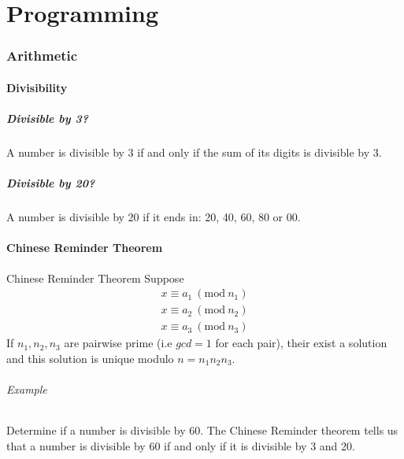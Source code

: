 \part{Programming}

\section{Arithmetic}

\subsection{Divisibility}
\subsubsection{Divisible by 3?}
A number is divisible by 3 if and only if the sum of its digits is divisible by 3.

\subsubsection{Divisible by 20?}
A number is divisible by 20 if it ends in: 20, 40, 60, 80 or 00.

\subsection{Chinese Reminder Theorem}

\theoremstyle{definition}
\begin{definition}{Chinese Reminder Theorem}
Suppose
\begin{equation}
    \begin{split}
        x \equiv a_1  \ (\textrm{mod}\ n_1) \\
        x \equiv a_2  \ (\textrm{mod}\ n_2) \\
        x \equiv a_3  \ (\textrm{mod}\ n_3)
    \end{split}
\end{equation}
If $n_1, n_2, n_3$ are pairwise prime (i.e $gcd = 1$ for each pair), their exist a solution and this solution is unique modulo $n = n_1 n_2 n_3$.
\end{definition}

\paragraph{Example}
Determine if a number is divisible by 60. The Chinese Reminder theorem tells us that a number is divisible by 60 if and only if it is divisible by 3 and 20.


